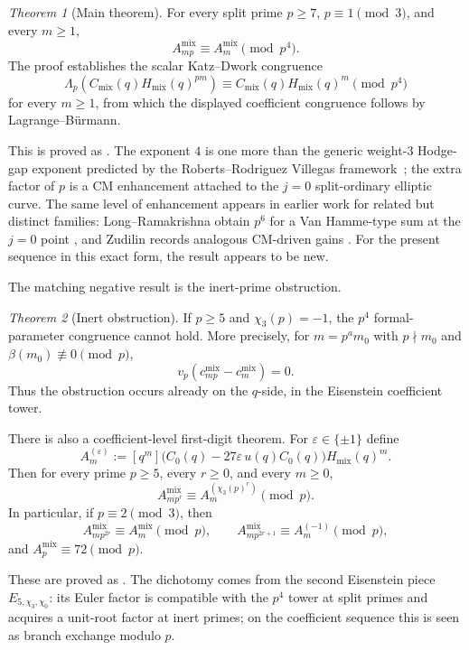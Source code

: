 \documentclass[11pt]{amsart}
\theoremstyle{definition}
\theoremstyle{remark}
\newtheorem*{theorem*}{Theorem}
\newcommand{\vp}{v_p}
\begin{document}
\begin{theorem*}[Main theorem]
For every split prime $p\ge 7$, $p\equiv 1\pmod 3$, and every $m\ge 1$,
\[
A_{mp}^{\mathrm{mix}}\equiv A_m^{\mathrm{mix}}\pmod{p^4}.
\]
The proof establishes the scalar Katz--Dwork congruence
\[
\Lambda_p\!\left(C_{\mathrm{mix}}(q)H_{\mathrm{mix}}(q)^{pm}\right)\equiv C_{\mathrm{mix}}(q)H_{\mathrm{mix}}(q)^m\pmod{p^4}
\]
for every $m\ge 1$, from which the displayed coefficient congruence follows by Lagrange--B\"urmann.
\end{theorem*}

This is proved as . The exponent $4$ is one more than the generic weight-$3$ Hodge-gap exponent predicted by the Roberts--Rodriguez Villegas framework~\cite{RRV}; the extra factor of $p$ is a CM enhancement attached to the $j=0$ split-ordinary elliptic curve. The same level of enhancement appears in earlier work for related but distinct families: Long--Ramakrishna obtain $p^6$ for a Van Hamme-type sum at the $j=0$ point \cite{LR}, and Zudilin records analogous CM-driven gains \cite{Zudilin-HRJ}. For the present sequence in this exact form, the result appears to be new.

The matching negative result is the inert-prime obstruction.

\begin{theorem*}[Inert obstruction]
If $p\ge 5$ and $\chi_3(p)=-1$, the $p^4$ formal-parameter congruence cannot hold. More precisely, for $m=p^am_0$ with $p\nmid m_0$ and $\beta(m_0)\not\equiv 0\pmod p$,
\[
\vp(c_{mp}^{\mathrm{mix}}-c_m^{\mathrm{mix}})=0.
\]
Thus the obstruction occurs already on the $q$-side, in the Eisenstein coefficient tower.
\end{theorem*}

There is also a coefficient-level first-digit theorem. For $\varepsilon\in\{\pm1\}$ define
\[
A_m^{(\varepsilon)}:=[q^m]\bigl(C_0(q)-27\varepsilon\,u(q)C_0(q)\bigr)H_{\mathrm{mix}}(q)^m.
\]
Then for every prime $p\ge5$, every $r\ge0$, and every $m\ge0$,
\[
A_{mp^r}^{\mathrm{mix}}\equiv A_m^{(\chi_3(p)^r)}\pmod p.
\]
In particular, if $p\equiv2\pmod3$, then
\[
A_{mp^{2r}}^{\mathrm{mix}}\equiv A_m^{\mathrm{mix}}\pmod p,
\qquad
A_{mp^{2r+1}}^{\mathrm{mix}}\equiv A_m^{(-1)}\pmod p,
\]
and $A_p^{\mathrm{mix}}\equiv72\pmod p$.

These are proved as . The dichotomy comes from the second Eisenstein piece $E_{5,\chi_3,\chi_0}$: its Euler factor is compatible with the $p^4$ tower at split primes and acquires a unit-root factor at inert primes; on the coefficient sequence this is seen as branch exchange modulo $p$.
\end{document}
